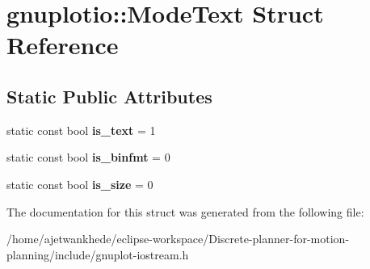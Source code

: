 \hypertarget{structgnuplotio_1_1ModeText}{}\section{gnuplotio\+:\+:Mode\+Text Struct Reference}
\label{structgnuplotio_1_1ModeText}
\subsection*{Static Public Attributes}
\begin{DoxyCompactItemize}
\item 
\mbox{\label{structgnuplotio_1_1ModeText_a7083d8977c354a036a7c542bf99d3d52}} 
static const bool {\bfseries is\+\_\+text} = 1
\item 
\mbox{\label{structgnuplotio_1_1ModeText_a4c771363d894ae64d6af961ffde35126}} 
static const bool {\bfseries is\+\_\+binfmt} = 0
\item 
\mbox{\label{structgnuplotio_1_1ModeText_aaffc1e7bb26c6d1404cb5a3f03f13be9}} 
static const bool {\bfseries is\+\_\+size} = 0
\end{DoxyCompactItemize}


The documentation for this struct was generated from the following file\+:\begin{DoxyCompactItemize}
\item 
/home/ajetwankhede/eclipse-\/workspace/\+Discrete-\/planner-\/for-\/motion-\/planning/include/gnuplot-\/iostream.\+h\end{DoxyCompactItemize}
